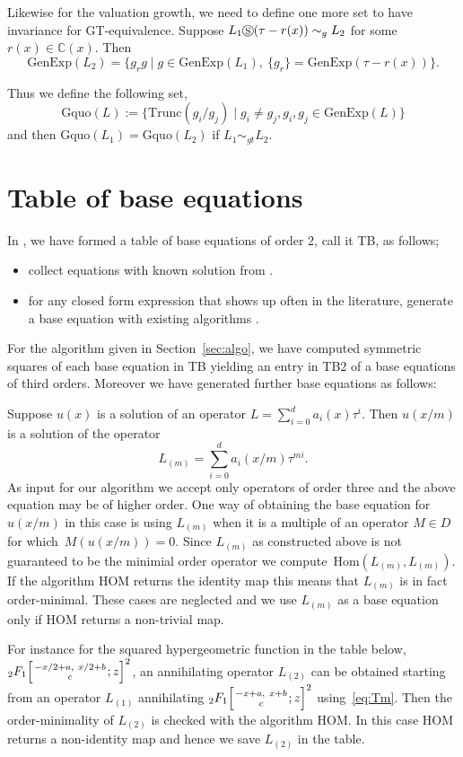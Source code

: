 \documentclass{article}
\newcommand{\C}{{\mathbb{C}}} \newcommand{\N}{{\mathbb{N}}}
\newcommand{\Hom}{\mathrm{Hom}}
\newcommand{\cS}{\circledS}
\newcommand{\genexp}{\mathrm{GenExp}}
\newcommand{\trunc}{\mathrm{Trunc}}
\newcommand{\Gq}{\mathrm{Gquo}}
\begin{document}
Likewise for the valuation growth, we need to define one more set to have invariance for GT-equivalence.
Suppose $L_1 \cS (\tau-r(x)) \sim_g L_2$ for some $r(x) \in \C(x)$. Then 
$$\genexp(L_2)=\{ g_r g \mid g \in \genexp(L_1), \ \{g_r\}=\genexp(\tau-r(x)) \}.$$


Thus we define the following set,
$$\Gq(L):=\{ \trunc(g_i/g_j) \mid g_i \neq g_j,  g_i, g_j \in \genexp(L)\}$$
and then $\Gq(L_1)=\Gq(L_2)$ if $L_1 \sim_{gt} L_2$.



\section{Table of base equations}



In \cite{YC11, CHG10}, we have formed a table of base equations of order 2, call it TB, as follows;
\begin{itemize}
\item collect equations with known solution from \cite{abst, AG76}.
\item for any closed form expression that shows up often in the literature, generate a base equation with existing algorithms \cite{ChyzakDM, KoutschHF}.
\end{itemize}
For the algorithm given in Section~\ref{sec:algo}, we have computed symmetric squares of each base equation in TB yielding an entry in TB2 of a base equations of third orders.  Moreover we have generated further base equations as follows:

Suppose $u(x)$ is a solution of an operator $L=\sum_{i=0}^d a_i(x)\tau^i$.
Then $u(x/m)$ is a solution of the operator
\begin{equation} \label{eq:Tm}
 L_{(m)}=\sum_{i=0}^d a_i(x/m)\tau^{mi}.
\end{equation}
As input for our algorithm we accept only operators of order three and the above equation
may be of higher order. One way of obtaining the base equation for $u(x/m)$ in this case
is using $L_{(m)}$ when it is a multiple of an operator $M\in D$ for which~$M(u(x/m))=0$.
Since $L_{(m)}$ as constructed above is not guaranteed to be the minimial order operator
we compute~$\Hom(L_{(m)},L_{(m)})$. If the algorithm HOM returns the identity map this means
that $L_{(m)}$ is in fact order-minimal. These cases are neglected and
we use $L_{(m)}$ as a base equation only if HOM returns a non-trivial map.

For instance for the squared hypergeometric function in the table below,
${}_2F_1\Big[\genfrac{}{}{0pt}{}{-x/2+a, \ x/2+b}{c} ; z \Big]^2$, an annihilating
operator $L_{(2)}$ can be obtained starting from an operator $L_{(1)}$ annihilating
${}_2F_1\Big[\genfrac{}{}{0pt}{}{-x+a, \ x+b}{c} ; z \Big]^2$ using~\eqref{eq:Tm}.  Then
the order-minimality of $L_{(2)}$ is checked with the algorithm HOM. In this case HOM returns
a non-identity map and hence we save $L_{(2)}$ in the table.
\end{document}
